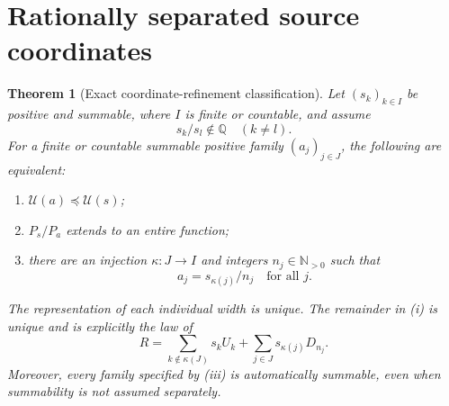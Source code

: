 \documentclass[11pt,letterpaper]{article}
\newtheorem{theorem}{Theorem}[section]
\theoremstyle{definition}
\theoremstyle{remark}
\newcommand{\Np}{\mathbb N_{>0}}
\newcommand{\Q}{\mathbb Q}
\newcommand{\Un}{\mathcal U}
\numberwithin{equation}{section}
\begin{document}
\section{Rationally separated source coordinates}\label{sec:separated}
\begin{theorem}[Exact coordinate-refinement classification]\label{thm:separated}
Let $(s_k)_{k\in I}$ be positive and summable, where $I$ is finite or countable, and assume
\begin{equation}\label{eq:separation}
 s_k/s_l\notin\Q\quad(k\ne l).
\end{equation}
For a finite or countable summable positive family $(a_j)_{j\in J}$, the following are equivalent:
\begin{enumerate}[label=(\roman*),nosep]
\item $\Un(a)\preceq\Un(s)$;
\item $P_s/P_a$ extends to an entire function;
\item there are an injection $\kappa:J\to I$ and integers $n_j\in\Np$ such that
\begin{equation}\label{eq:assignment}
 a_j=s_{\kappa(j)}/n_j\quad\text{for all }j.
\end{equation}
\end{enumerate}
The representation of each individual width is unique. The remainder in (i) is unique and is explicitly the law of
\begin{equation}\label{eq:remainder}
 R=\sum_{k\notin\kappa(J)}s_kU_k+
   \sum_{j\in J}s_{\kappa(j)}D_{n_j}.
\end{equation}
Moreover, every family specified by (iii) is automatically summable, even when summability is not assumed separately.
\end{theorem}
\end{document}
